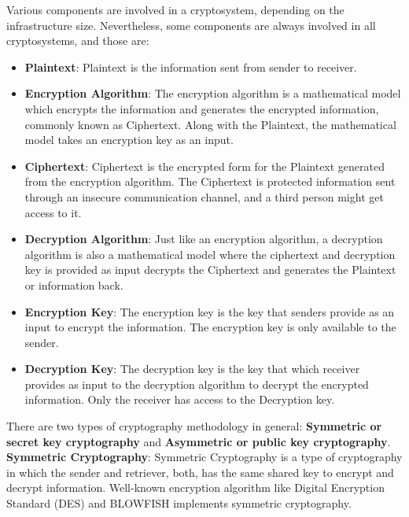\documentclass[12pt,a4paper]{article}
\begin{document}
Various components are involved in a cryptosystem, depending on the infrastructure size. Nevertheless, some components are always involved in all cryptosystems, and those are:

\begin{itemize}

\item \textbf{Plaintext}: Plaintext is the information sent from sender to receiver. \cite{r23}

\item \textbf{Encryption Algorithm}: The encryption algorithm is a mathematical model which encrypts the information and generates the encrypted information, commonly known as Ciphertext. Along with the Plaintext, the mathematical model takes an encryption key as an input. \cite{r23}

\item \textbf{Ciphertext}: Ciphertext is the encrypted form for the Plaintext generated from the encryption algorithm. The Ciphertext is protected information sent through an insecure communication channel, and a third person might get access to it. \cite{R23}

\item \textbf{Decryption Algorithm}: Just like an encryption algorithm, a decryption algorithm is also a mathematical model where the ciphertext and decryption key is provided as input decrypts the Ciphertext and generates the Plaintext or information back. \cite{r23}

\item \textbf{Encryption Key}: The encryption key is the key that senders provide as an input to encrypt the information. The encryption key is only available to the sender.\cite{r23}

\item \textbf{Decryption Key}: The decryption key is the key that which receiver provides as input to the decryption algorithm to decrypt the encrypted information. Only the receiver has access to the Decryption key. \cite{r23}

\end{itemize}

There are two types of cryptography methodology in general: \textbf{Symmetric or secret key cryptography} and \textbf{Asymmetric or public key cryptography}. \cite{r24} \\

\textbf{Symmetric Cryptography}: Symmetric Cryptography is a type of cryptography in which the sender and retriever, both, has the same shared key to encrypt and decrypt information. Well-known encryption algorithm like Digital Encryption Standard (DES) and BLOWFISH implements symmetric cryptography. \cite{r23}
\end{document}
